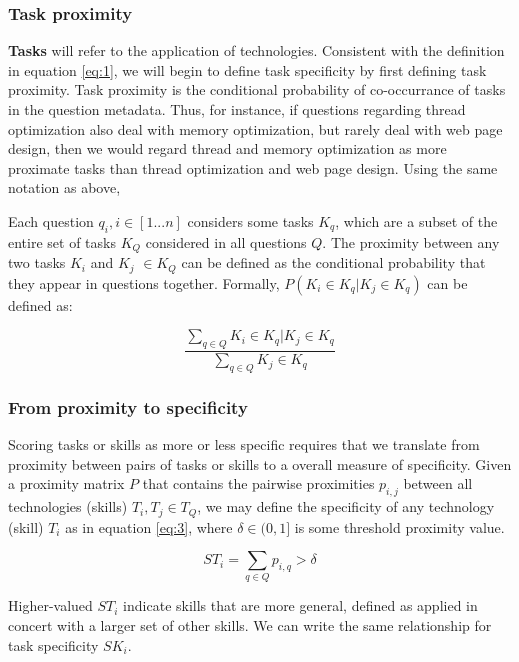 \documentclass[11pt]{article}
\begin{document}
\subsubsection{Task proximity}
\label{sec:task-specificity}

\textbf{Tasks} will refer to the application of
technologies. Consistent with the definition in equation \ref{eq:1},
we will begin to define task specificity by first defining task
proximity. Task proximity is the conditional probability of
co-occurrance of tasks in the question metadata. Thus, for instance, if questions regarding thread
optimization also deal with memory optimization, but rarely deal with
web page design, then we would regard thread and memory optimization
as more proximate tasks than thread optimization and web page design. Using the same notation as above, 

Each question
$q_i, i \in [1...n]$ considers some tasks $K_q$, which are a subset of the entire set of tasks $K_Q$ considered in all
questions $Q$. The proximity between any two tasks $K_i$ and
$K_j$ $\in K_Q$ can be defined as the conditional
probability that they appear in questions together. Formally, $P(K_i
\in K_q | K_j \in K_q)$ can be defined as:

\begin{equation}
  \label{eq:2}
  \frac{\sum_{q \in Q} K_i \in K_q | K_j \in K_q}{\sum_{q \in Q} K_j \in K_q}
\end{equation}

\subsubsection{From proximity to specificity}
\label{sec:from-prox-spec}

Scoring tasks or skills as more or less specific requires that we
translate from proximity between pairs of tasks or skills to a overall
measure of specificity. Given a proximity matrix $P$ that contains the
pairwise proximities $p_{i,j}$ between all technologies (skills) $T_i, T_j \in T_Q$, we may define the
specificity of any technology (skill) $T_i$ as in equation \ref{eq:3}, where
$\delta \in (0,1]$ is some threshold proximity value.

\begin{equation}
  \label{eq:3}
  ST_i = \sum_{q \in Q} p_{i,q} > \delta 
\end{equation}

Higher-valued $ST_i$ indicate skills that are more general, defined as
applied in concert with a larger set of other skills. We can write the
same relationship for task specificity $SK_i$.
\end{document}
